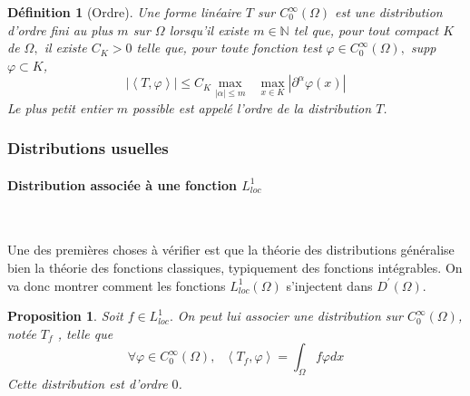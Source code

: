 \documentclass[3pt]{article}
\newtheorem{definition}[theorem]{D\'{e}finition}
\newtheorem{proposition}[theorem]{Proposition}
\begin{document}
\bigskip 

\begin{definition}[Ordre]
Une forme lin\'{e}aire $T$ sur $C_{0}^{\infty }(\Omega )$ est une
distribution d'ordre fini au plus $m$ sur $\Omega $ lorsqu'il existe $m\in 
\mathbb{N}$  tel que, pour tout compact $K$ de $\Omega ,$ il existe $C_{K}>0$
telle que, pour toute fonction test $\varphi \in C_{0}^{\infty }(\Omega ),$
supp $\varphi \subset K$,%
\begin{equation*}
\left\vert \left\langle T,\varphi \right\rangle \right\vert \leq C_{K}%
\underset{\left\vert \alpha \right\vert \leq m}{\max }\text{ }\underset{x\in
K}{\max }\left\vert \partial ^{\alpha }\varphi (x)\right\vert 
\end{equation*}%
Le plus petit entier $m$ possible est appel\'{e} l'ordre de la distribution $%
T$.
\end{definition}

\bigskip 

\bigskip 

\subsubsection{Distributions usuelles}

\paragraph{Distribution associ\'{e}e \`{a} une fonction $L_{loc}^{1}$}

~\newline

Une des premi\`{e}res choses \`{a} v\'{e}rifier est que la th\'{e}orie des
distributions g\'{e}n\'{e}ralise bien la th\'{e}orie des fonctions
classiques, typiquement des fonctions int\'{e}grables. On va donc montrer
comment les fonctions $L_{loc}^{1}(\Omega )$ s'injectent dans $D^{\prime
}(\Omega )$.

\bigskip 

\begin{proposition}
Soit $f\in L_{loc}^{1}.$ On peut lui associer une distribution sur $%
C_{0}^{\infty }(\Omega )$, not\'{e}e $T_{f}$ , telle que%
\begin{equation*}
\forall \varphi \in C_{0}^{\infty }(\Omega ),\text{ }\left\langle
T_{f},\varphi \right\rangle =\int_{\Omega }f\varphi dx
\end{equation*}%
Cette distribution est d'ordre $0$. 
\end{proposition}
\end{document}
